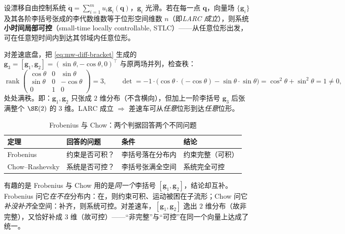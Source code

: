 \begin{theorem}\label{thm:mw-chow}
设漂移自由控制系统 $\dot{\mathbf{q}}=\sum_{i=1}^m u_i\mathbf{g}_i(\mathbf{q})$，$\mathbf{g}_i$ 光滑。若在每一点 $\mathbf{q}$，向量场 $\{\mathbf{g}_i\}$ 及其各阶李括号张成的李代数维数等于位形空间维数 $n$（即\emph{LARC 成立}），则系统\textbf{小时间局部可控}（small-time locally controllable, STLC）——从任意位形出发，可在任意短时间内到达其邻域内任意位形。
\end{theorem}

对差速底盘，把 \cref{eq:mw-diff-bracket} 生成的 $\mathbf{g}_3=[\mathbf{g}_1,\mathbf{g}_2]=(\sin\theta,-\cos\theta,0)^\top$ 与原两场并列，检查秩：
\begin{equation}
  \operatorname{rank}\begin{pmatrix}\cos\theta&0&\sin\theta\\\sin\theta&0&-\cos\theta\\0&1&0\end{pmatrix}=3,\qquad
  \det=-1\cdot\big(\cos\theta\cdot(-\cos\theta)-\sin\theta\cdot\sin\theta\big)=\cos^2\theta+\sin^2\theta=1\neq0,
  \label{eq:mw-larc}
\end{equation}
处处满秩。即：$\mathbf{g}_1,\mathbf{g}_2$ 只张成 $2$ 维分布（不含横向），但加上一阶李括号 $\mathbf{g}_3$ 后张满整个 $\SE(2)$ 的 $3$ 维。LARC 成立 $\Rightarrow$ 差速车可从\emph{任意}位形到达\emph{任意}位形。

\begin{table}[H]\centering\small
\caption{Frobenius 与 Chow：两个判据回答两个不同问题}
\begin{tabular}{llll}
\toprule
定理 & 回答的问题 & 条件 & 结论 \\
\midrule
Frobenius & 约束是否可积？ & 李括号落在分布内 & 约束完整（可积） \\
Chow--Rashevsky & 系统是否可控？ & 李括号张满全空间 & 系统完全可控 \\
\bottomrule
\end{tabular}
\end{table}

\begin{insight}\label{ins:mw-twoside}
有趣的是 Frobenius 与 Chow 用的是\emph{同一个}李括号 $[\mathbf{g}_1,\mathbf{g}_2]$，结论却互补。Frobenius 问它\emph{在不在}分布内：在，则约束可积、运动被困在子流形；Chow 问它\emph{补没补齐}全空间：补齐，则系统可控。对差速车，$[\mathbf{g}_1,\mathbf{g}_2]$ 逸出 $2$ 维分布（故非完整），又恰好补成 $3$ 维（故可控）——“非完整”与“可控”在同一个向量上达成了统一。
\end{insight}

